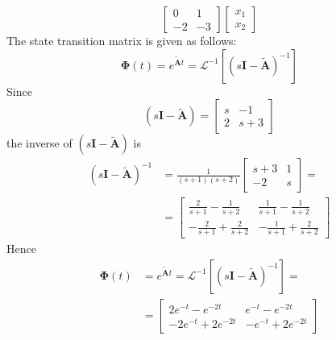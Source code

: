 \documentclass[12pt,a4paper,oneside]{book}
\begin{document}
\begin{onehalfspace}
\begin{example}
\begin{equation}
		\left[ \begin{matrix}
			0 & 1 \\[6pt]
			-2 & -3
		\end{matrix}\right]
		\left[ \begin{matrix}
			{x}_1 \\[6pt]
			{x}_2
		\end{matrix}\right]
	\end{equation}
	The state transition matrix is given as follows:
	\begin{equation}
		\mathbf{\Phi}(t) = e^{\tilde{\mathbf{A}}t} = \mathcal{L}^{-1}\left[ \left(s\mathbf{I}-\tilde{\mathbf{A}} \right)^{-1} \right]
	\end{equation}
	Since
	\begin{equation}
		\left(s\mathbf{I}-\tilde{\mathbf{A}} \right) = 
		\left[ \begin{matrix}
			s & -1 \\[6pt] 2 & s+3
		\end{matrix}\right] 
	\end{equation}
	the inverse of $\left(s\mathbf{I}-\tilde{\mathbf{A}} \right)$ is 
	\begin{equation}
		\begin{aligned}
			\left(s\mathbf{I}-\tilde{\mathbf{A}} \right)^{-1} &= \frac{1}{(s+1)(s+2)}
			\left[ \begin{matrix}
				s+3 & 1 \\-2 & s
			\end{matrix}\right] = \\[8pt]
			&= \left[ \begin{matrix}
				\frac{2}{s+1}-\frac{1}{s+2} & \frac{1}{s+1}-\frac{1}{s+2} \\[8pt]
				-\frac{2}{s+1}+\frac{2}{s+2} & -\frac{1}{s+1}+\frac{2}{s+2}
			\end{matrix}\right] 
		\end{aligned}
	\end{equation}
	Hence
	\begin{equation}
		\begin{aligned}
			\mathbf{\Phi}(t) &= e^{\tilde{\mathbf{A}}t} = \mathcal{L}^{-1}\left[ \left(s\mathbf{I}-\tilde{\mathbf{A}} \right)^{-1} \right] = \\[8pt]
			&= \left[ \begin{matrix}
				2e^{-t}-e^{-2t} & e^{-t}-e^{-2t}\\[8pt]
				-2e^{-t}+2e^{-2t} & -e^{-t}+2e^{-2t}
			\end{matrix}\right]
		\end{aligned}

\end{equation}
\end{example}
\end{onehalfspace}
\end{document}
